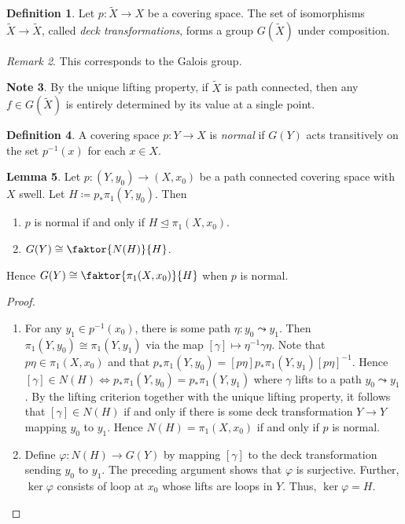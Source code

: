 \documentclass[10pt,letterpaper,cm]{nupset}
\theoremstyle{definition}
\newtheorem{definition}{Definition}[subsection]
\newtheorem{note}[definition]{Note}
\theoremstyle{theorem}
\newtheorem{lemma}[definition]{Lemma}
\theoremstyle{remark}
\newtheorem{remark}[definition]{Remark}
\newcommand{\1}{\mathbb{1}}
\newcommand{\0}{\vec 0}
\begin{document}
\begin{definition}
Let $p: \widetilde{X} \to X$ be a covering space. The set of isomorphisms $\widetilde{X}  \to \widetilde{X} $, called \textit{deck transformations}, forms a group $G(\widetilde{X})$ under composition. 
\end{definition}

\begin{remark}
This corresponds to the Galois group.
\end{remark}

\begin{note}
By the unique lifting property, if $\widetilde{X}$ is path connected, then any $f\in G(\widetilde{X} )$ is entirely determined by its value at a single point.
\end{note}

\begin{definition}
A covering space $p:Y \to X$ is \textit{normal} if $G(Y)$ acts transitively on the set $p^{-1}(x)$ for each $x\in X$.
\end{definition}

\begin{lemma}
Let $p: (Y, y_0) \to (X, x_0)$ be a path connected covering space with $X$ swell. Let $H\coloneqq  p_{\ast}\pi_1(Y, y_0)$. Then 
\begin{enumerate}
\item $p$ is normal if and only if $H \unlhd \pi_1(X, x_0)$.
\item $G(Y) \cong \faktor{N(H)}{H}$. 
\end{enumerate}
Hence $G(Y) \cong \faktor{\pi_1(X, x_0)}{H}$ when $p$ is normal.
\end{lemma}
\begin{proof} $ $
\begin{enumerate}
\item For any $y_1 \in p^{-1}(x_0)$, there is some path $\eta : y_0 \leadsto y_1$. Then $\pi_1(Y, y_0) \cong \pi_1(Y, y_1)$ via the map $[\gamma] \mapsto \eta^{-1} \gamma \eta$. Note that $p \eta \in \pi_1(X, x_0)$ and that $p_{\ast} \pi_1(Y, y_0) = [p \eta]p_{\ast} \pi_1(Y, y_1) [p\eta]^{-1}$. Hence $[\gamma] \in N(H) \iff  p_{\ast} \pi_1(Y, y_0) = p_{\ast} \pi_1(Y, y_1)$ where $\gamma$ lifts to a path $y_0 \leadsto y_1$. By the lifting criterion together with the unique lifting property, it follows that $[\gamma] \in N(H)$ if and only if there is some deck transformation $Y \to Y$ mapping $y_0$ to $y_1$. Hence $N(H) = \pi_1(X, x_0)$ if and only if $p$ is normal. 
\item Define $\varphi : N(H) \to G(Y)$ by mapping $[\gamma]$ to the deck transformation sending $y_0$ to $y_1$. The preceding argument shows that $\varphi$ is surjective. Further, $\ker{\varphi}$ consists of loop at $x_0$ whose lifts are loops in $Y$. Thus, $\ker{\varphi} = H$. 
\end{enumerate}
\end{proof}
\end{document}
